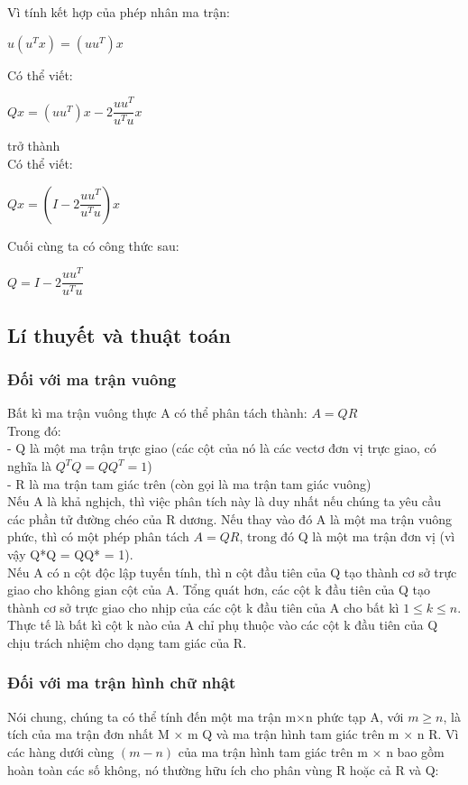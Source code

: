 Vì tính kết hợp của phép nhân ma trận:\\
\begin{center}
	$u(u^{T}x)=(uu^{T})x$
\end{center}
Có thể viết:\\
\begin{center}
	$Qx=(uu^{T})x-2\dfrac{uu^{T}}{u^{T}u}x$
\end{center}
trở thành\\
Có thể viết:\\
\begin{center}
	$Qx=(I-2\dfrac{uu^{T}}{u^{T}u})x$
\end{center}
Cuối cùng ta có công thức sau:\\
\begin{center}
	$Q=I-2\dfrac{uu^{T}}{u^{T}u}$
\end{center}

\subsection{Lí thuyết và thuật toán}
\subsubsection{Đối với ma trận vuông}
Bất kì ma trận vuông thực A có thể phân tách thành: $A = QR$\\
Trong đó:\\
- Q là một ma trận trực giao (các cột của nó là các vectơ đơn vị trực giao, có 
nghĩa là $Q^{T}Q = QQ^{T}= 1$) \\
- R là ma trận tam giác trên (còn gọi là ma trận tam giác vuông)\\
Nếu A là khả nghịch, thì việc phân tích này là duy nhất nếu chúng ta yêu cầu các phần
tử đường chéo của R dương. Nếu thay vào đó A là một ma trận vuông phức, thì có một
phép phân tách $A = QR$, trong đó Q là một ma trận đơn vị (vì vậy Q*Q = QQ* = 1).\\
Nếu A có n cột độc lập tuyến tính, thì n cột đầu tiên của Q tạo thành cơ sở trực giao
cho không gian cột của A. Tổng quát hơn, các cột k đầu tiên của Q tạo thành cơ sở
trực giao cho nhịp của các cột k đầu tiên của A cho bất kì $1 \leq k \leq n$. Thực tế là bất kì
cột k nào của A chỉ phụ thuộc vào các cột k đầu tiên của Q chịu trách nhiệm cho dạng
tam giác của R.
\\
\subsubsection{Đối với ma trận hình chữ nhật}
Nói chung, chúng ta có thể tính đến một ma trận m×n phức tạp A, với $m \geq n$, là tích
của ma trận đơn nhất M × m Q và ma trận hình tam giác trên m × n R. Vì các hàng dưới
cùng $(m−n)$ của ma trận hình tam giác trên m × n bao gồm hoàn toàn các số không, nó
thường hữu ích cho phân vùng R hoặc cả R và Q:

